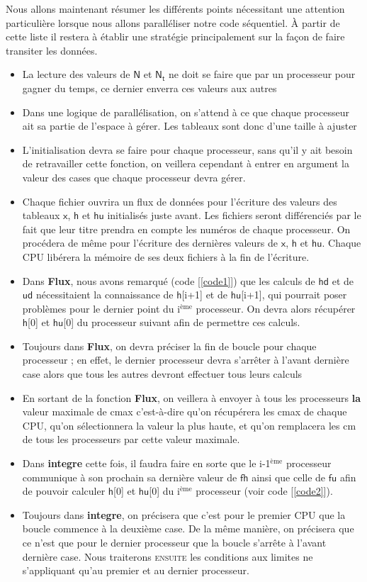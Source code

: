 \documentclass[french]{article}
\newcommand{\cad}{c'est-à-dire}
\newcommand{\iieme}{i$^{\text{ème}}$}
\newcommand{\xhhu}{$\mathsf{x}$, $\mathsf{h}$ et $\mathsf{hu}$}
\begin{document}
Nous allons maintenant résumer les différents points nécessitant une attention particulière lorsque nous allons paralléliser notre code séquentiel. À partir de cette liste il restera à établir une stratégie principalement sur la façon de faire transiter les données.
 \begin{itemize}
 \renewcommand{\labelitemi}{∙}
 \item La lecture des valeurs de $\mathsf{N}$ et $\mathsf{N_t}$ ne doit se faire que par un processeur pour gagner du temps, ce dernier enverra ces valeurs aux autres 
 \item Dans une logique de parallélisation, on s'attend à ce que chaque processeur ait sa partie de l'espace à gérer. Les tableaux sont donc d'une taille à ajuster
 \item L'initialisation devra se faire pour chaque processeur, sans qu'il y ait besoin de retravailler cette fonction, on veillera cependant à entrer en argument la valeur des cases que chaque processeur devra gérer.
 \item Chaque fichier ouvrira un flux de données pour l'écriture des valeurs des tableaux \xhhu $ $ initialisés juste avant. Les fichiers seront différenciés par le fait que leur titre prendra en compte les numéros de chaque processeur. On procédera de même pour l'écriture des dernières valeurs de \xhhu . Chaque CPU libérera la mémoire de ses deux fichiers à la fin de l'écriture.  
 \item Dans \textbf{Flux}, nous avons remarqué (code [\ref{code1}]) que les calculs de $\mathsf{hd}$ et de $\mathsf{ud}$ nécessitaient la connaissance de $\mathsf{h}$[i+1] et de $\mathsf{hu}$[i+1], qui pourrait poser problèmes pour le dernier point du \iieme $ $ processeur. On devra alors récupérer $\mathsf{h}$[0] et $\mathsf{hu}$[0] du processeur suivant afin de permettre ces calculs.
 \item Toujours dans \textbf{Flux}, on devra préciser la fin de boucle pour chaque processeur ; en effet, le dernier processeur devra s'arrêter à l'avant dernière case alors que tous les autres devront effectuer tous leurs calculs
 \item En sortant de la fonction \textbf{Flux}, on veillera à envoyer à tous les processeurs \textbf{la} valeur maximale de cmax \cad $ $ qu'on récupérera les cmax de chaque CPU, qu'on sélectionnera la valeur la plus haute, et qu'on remplacera les cm de tous les processeurs par cette valeur maximale.
\item Dans \textbf{integre} cette fois, il faudra faire en sorte que le i-1$^{\text{ème}}$ processeur communique à son prochain sa dernière valeur de $\mathsf{fh}$ ainsi que celle de $\mathsf{fu}$ afin de pouvoir calculer $\mathsf{h}$[0] et $\mathsf{hu}$[0] du \iieme $ $ processeur (voir code [\ref{code2}]).
\item Toujours dans \textbf{integre}, on précisera que c'est pour le premier CPU que la boucle commence à la deuxième case. De la même manière, on précisera que ce n'est que pour le dernier processeur que la boucle s'arrête à l'avant dernière case. Nous traiterons \textsc{ensuite} les conditions aux limites ne s'appliquant qu'au premier et au dernier processeur.
 
 \end{itemize}
\end{document}
